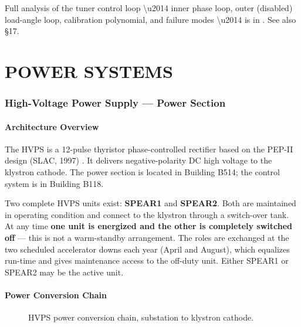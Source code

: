 \begin{keynote}
Full analysis of the tuner control loop \textbackslash u2014 inner phase loop, outer (disabled) load-angle loop, calibration polynomial, and failure modes \textbackslash u2014 is in  . See also §17.
\end{keynote}



\FloatBarrier\clearpage
\part{POWER SYSTEMS}



\section{High-Voltage Power Supply --- Power Section}

\subsection{Architecture Overview}

The HVPS is a 12-pulse thyristor phase-controlled rectifier based on the PEP-II design (SLAC, 1997) . It delivers negative-polarity DC high voltage to the klystron cathode. The power section is located in Building B514; the control system is in Building B118.

Two complete HVPS units exist: \textbf{SPEAR1} and \textbf{SPEAR2}. Both are maintained in operating condition and connect to the klystron through a switch-over tank. At any time \textbf{one unit is energized and the other is completely switched off} --- this is not a warm-standby arrangement. The roles are exchanged at the two scheduled accelerator downs each year (April and August), which equalizes run-time and gives maintenance access to the off-duty unit. Either SPEAR1 or SPEAR2 may be the active unit.

\subsection{Power Conversion Chain}

\begin{figure}[tbp]\centering
\begin{fitpicture}\end{fitpicture}
\caption{HVPS power conversion chain, substation to klystron cathode.}\label{fig:hvps-chain}
\end{figure}

